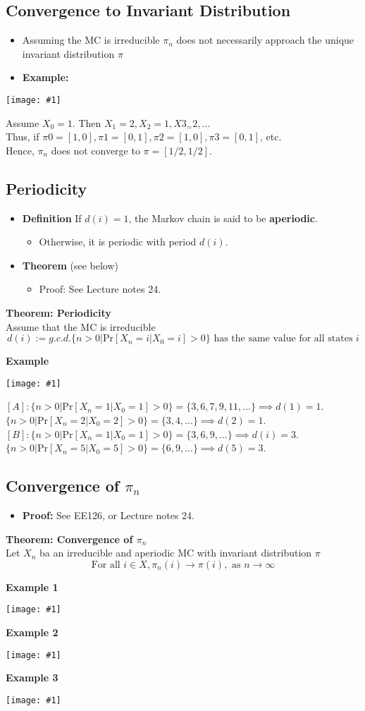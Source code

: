 \documentclass{article}
\newcommand{\x}[1]{\textrm{#1}}
\newcommand{\pr}[1]{\textrm{Pr}[#1]}
\newcommand{\xs}[1]{\textrm{ #1 }}
\newcommand{\dpic}[1]{\begin{center}\texttt{[image: \#1]}\end{center}}
\newcommand{\eq}[1]{\begin{equation}#1\end{equation}}
\newcommand{\set}[1]{\{#1\}}
\newcommand{\eqs}[1]{\begin{mdframed}#1\end{mdframed}}
\newcommand{\items}[1]{\begin{itemize}#1\end{itemize}}
\newcommand{\ninfty}{n\rightarrow\infty}
\begin{document}
\subsection*{Convergence to Invariant Distribution}
\items{
    \item Assuming the MC is irreducible $\pi_n$ does not necessarily approach the unique invariant distribution $\pi$
    \item \textbf{Example:}
}
\dpic{converge}
\begin{mdleftbar}
Assume $X_0 = 1$. Then $X_1 = 2,X_2 = 1,X3_ = 2,\ldots$\\
Thus, if $\pi0 = [1,0], \pi1 = [0,1], \pi2 = [1,0], \pi3 = [0,1]$, etc.\\
Hence, $\pi_n$ does not converge to $\pi = [1/2,1/2]$.
\end{mdleftbar}
\subsection*{Periodicity}
\items{
\item \textbf{Definition} If $d(i) = 1$, the Markov chain is said to be \textbf{aperiodic}.
    \items{
        \item  Otherwise, it is periodic with period $d(i)$.
    }
    \item \textbf{Theorem} (see below)
    \items{
        \item Proof: See Lecture notes 24.
    }
    
}
\eqs{
\textbf{Theorem: Periodicity}\\
Assume that the MC is irreducible
\eq{d(i) := g.c.d.\set{n > 0 | \pr{X_n = i | X_0 = i} > 0} \xs{has the same value for all states} i}
}
\textbf{Example}
\dpic{p1}
\begin{mdleftbar}
$[A]: \set{n > 0 | \pr{X_n = 1|X_0 = 1} > 0} = \set{3,6,7,9,11,...} \implies d(1) = 1$.\\
$\set{n > 0 | \pr{X_n = 2|X_0 = 2} > 0} = \set{3,4,...} \implies d(2) = 1$.\\
$[B]: \set{n > 0 | \pr{X_n = 1|X_0 = 1} > 0} = \set{3,6,9,...} \implies d(i) = 3$.\\
$\set{n > 0 | \pr{X_n = 5|X_0 = 5} > 0} = \set{6,9,...} \implies d(5) = 3$.
\end{mdleftbar}
\subsection*{Convergence of $\pi_n$}
\items{
    \item \textbf{Proof:} See EE126, or Lecture notes 24.
}
\eqs{
\textbf{Theorem: Convergence of $\pi_n$}\\
Let $X_n$ ba an irreducible and aperiodic MC with invariant distribution $\pi$
\eq{\x{For all } i \in X, \pi_n(i) \rightarrow \pi(i), \xs{as} \ninfty}
}
\textbf{Example 1}
\dpic{conv1}
\textbf{Example 2}
\dpic{conv2}
\textbf{Example 3}
\dpic{conv3}
\end{document}
